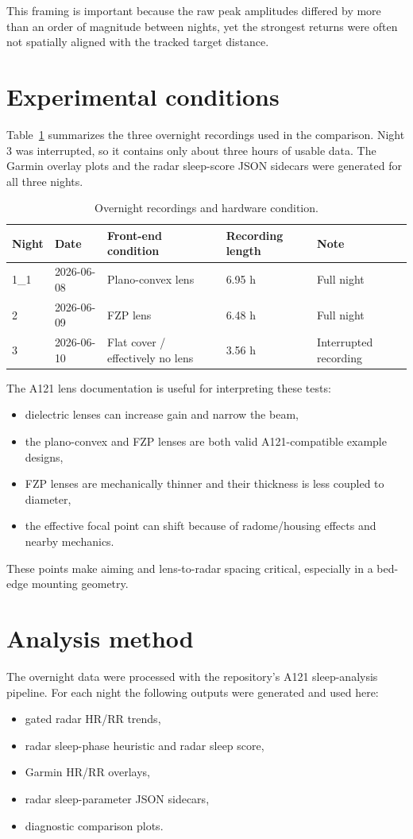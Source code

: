 \documentclass[11pt,a4paper]{article}
\begin{document}
This framing is important because the raw peak amplitudes differed by more than an order of magnitude between nights, yet the strongest returns were often not spatially aligned with the tracked target distance.

\section{Experimental conditions}
Table~\ref{tab:nights} summarizes the three overnight recordings used in the comparison. Night 3 was interrupted, so it contains only about three hours of usable data. The Garmin overlay plots and the radar sleep-score JSON sidecars were generated for all three nights.

\begin{table}[H]
\centering
\caption{Overnight recordings and hardware condition.}
\label{tab:nights}
\begin{tabular}{@{}lllll@{}}
\toprule
Night & Date & Front-end condition & Recording length & Note \\
\midrule
1\_1 & 2026-06-08 & Plano-convex lens & 6.95 h & Full night \\
2 & 2026-06-09 & FZP lens & 6.48 h & Full night \\
3 & 2026-06-10 & Flat cover / effectively no lens & 3.56 h & Interrupted recording \\
\bottomrule
\end{tabular}
\end{table}

The A121 lens documentation is useful for interpreting these tests:
\begin{itemize}
    \item dielectric lenses can increase gain and narrow the beam,
    \item the plano-convex and FZP lenses are both valid A121-compatible example designs,
    \item FZP lenses are mechanically thinner and their thickness is less coupled to diameter,
    \item the effective focal point can shift because of radome/housing effects and nearby mechanics.
\end{itemize}
These points make aiming and lens-to-radar spacing critical, especially in a bed-edge mounting geometry.

\section{Analysis method}
The overnight data were processed with the repository's A121 sleep-analysis pipeline. For each night the following outputs were generated and used here:
\begin{itemize}
    \item gated radar HR/RR trends,
    \item radar sleep-phase heuristic and radar sleep score,
    \item Garmin HR/RR overlays,
    \item radar sleep-parameter JSON sidecars,
    \item diagnostic comparison plots.
\end{itemize}
\end{document}
